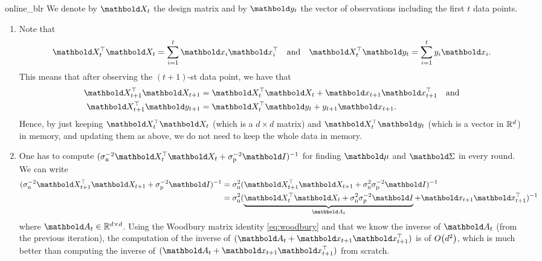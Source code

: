 \begin{solution}{online_blr}
  We denote by $\mX_t$ the design matrix and by $\vy_t$ the vector of observations including the first $t$ data points.
  \begin{enumerate}
    \item Note that \begin{align*}
      \transpose{\mX_t} \mX_t = \sum_{i=1}^t \vx_i \transpose{\vx_i} \quad\text{and}\quad \transpose{\mX_t} \vy_t = \sum_{i=1}^t y_i \vx_i.
    \end{align*}
    This means that after observing the $(t+1)$-st data point, we have that \begin{align*}
      \transpose{\mX_{t+1}} \mX_{t+1} &= \transpose{\mX_t} \mX_t + \vx_{t+1} \transpose{\vx_{t+1}} \quad\text{and} \\
      \transpose{\mX_{t+1}} \vy_{t+1} &= \transpose{\mX_t} \vy_t + y_{t+1} \vx_{t+1}.
    \end{align*}
    Hence, by just keeping $\transpose{\mX_t} \mX_t$ (which is a $d \times d$ matrix) and $\transpose{\mX_t} \vy_t$ (which is a vector in $\mathbb{R}^d$) in memory, and updating them as above, we do not need to keep the whole data in memory.

    \item One has to compute $\inv{(\sigman^{-2}\transpose{\mX_t}\mX_t + \sigmap^{-2}\mI)}$ for finding $\vmu$ and $\mSigma$ in every round.
    We can write \begin{align*}
      \inv{(\sigman^{-2}\transpose{\mX_{t+1}}\mX_{t+1} + \sigmap^{-2}\mI)} &= \sigman^2\inv{(\transpose{\mX_{t+1}}\mX_{t+1} + \sigman^2\sigmap^{-2}\mI)} \\
      &= \sigman^2\inv{(\underbrace{\transpose{\mX_t}\mX_t + \sigman^2\sigmap^{-2}\mI}_{\mA_t} + \vx_{t+1} \transpose{\vx_{t+1}})}
    \end{align*} where $\mA_t \in \R^{d \times d}$.
    Using the Woodbury matrix identity \eqref{eq:woodbury} and that we know the inverse of $\mA_t$ (from the previous iteration), the computation of the inverse of $(\mA_t + \vx_{t+1} \transpose{\vx_{t+1}})$ is of $\BigO{d^2}$, which is much better than computing the inverse of $(\mA_t + \vx_{t+1} \transpose{\vx_{t+1}})$ from scratch.
  \end{enumerate}
\end{solution}

